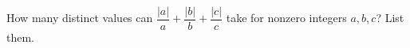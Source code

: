 How many distinct values can $\dfrac{|a|}{a}+\dfrac{|b|}{b}+\dfrac{|c|}{c}$ take for nonzero integers $a,b,c$? List them.
